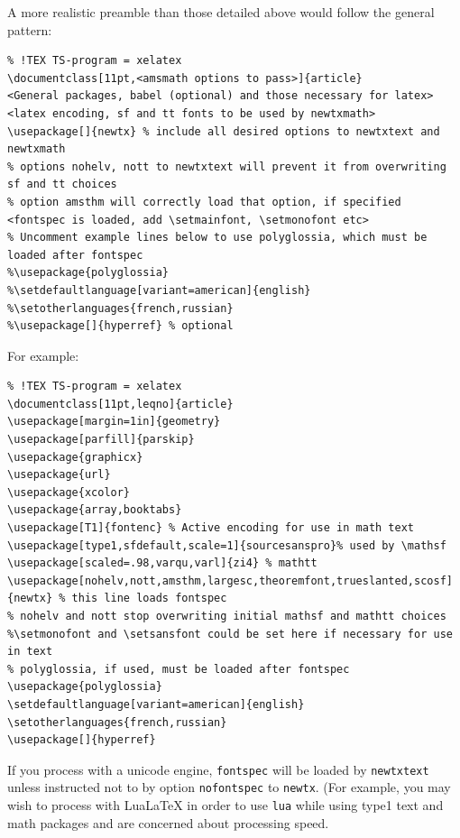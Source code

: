 \documentclass[\fsc]{article}
\theoremstyle{oldplain}
\theoremstyle{plain}
\begin{document}
A more realistic preamble than those detailed above would follow the general pattern:
\begin{verbatim}
% !TEX TS-program = xelatex
\documentclass[11pt,<amsmath options to pass>]{article}
<General packages, babel (optional) and those necessary for latex>
<latex encoding, sf and tt fonts to be used by newtxmath>
\usepackage[]{newtx} % include all desired options to newtxtext and newtxmath
% options nohelv, nott to newtxtext will prevent it from overwriting sf and tt choices
% option amsthm will correctly load that option, if specified
<fontspec is loaded, add \setmainfont, \setmonofont etc>
% Uncomment example lines below to use polyglossia, which must be loaded after fontspec
%\usepackage{polyglossia}
%\setdefaultlanguage[variant=american]{english}
%\setotherlanguages{french,russian}
%\usepackage[]{hyperref} % optional
\end{verbatim}
For example:
\begin{verbatim}
% !TEX TS-program = xelatex
\documentclass[11pt,leqno]{article}
\usepackage[margin=1in]{geometry} 
\usepackage[parfill]{parskip}
\usepackage{graphicx} 
\usepackage{url}
\usepackage{xcolor}
\usepackage{array,booktabs}
\usepackage[T1]{fontenc} % Active encoding for use in math text
\usepackage[type1,sfdefault,scale=1]{sourcesanspro}% used by \mathsf
\usepackage[scaled=.98,varqu,varl]{zi4} % mathtt
\usepackage[nohelv,nott,amsthm,largesc,theoremfont,trueslanted,scosf]{newtx} % this line loads fontspec
% nohelv and nott stop overwriting initial mathsf and mathtt choices 
%\setmonofont and \setsansfont could be set here if necessary for use in text
% polyglossia, if used, must be loaded after fontspec
\usepackage{polyglossia}
\setdefaultlanguage[variant=american]{english}
\setotherlanguages{french,russian}
\usepackage[]{hyperref}
\end{verbatim}
If you process with a unicode engine, {\tt fontspec} will be loaded by {\tt newtxtext} unless instructed not to by option {\tt nofontspec} to {\tt newtx}. (For example, you may wish to process with LuaLaTeX in order to use {\tt lua} while using type1 text and math packages and are concerned about processing speed.
\end{document}
